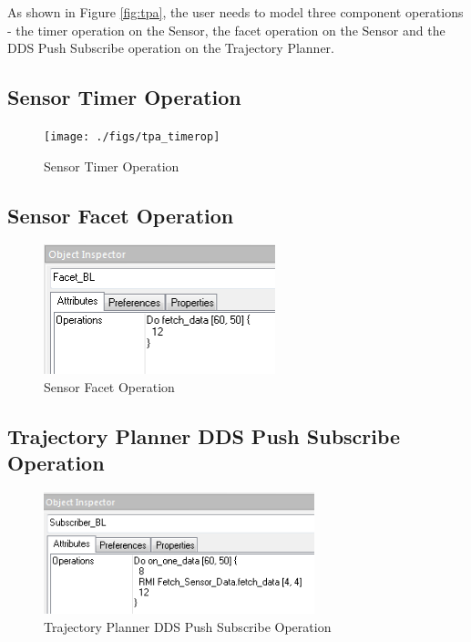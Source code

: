 As shown in Figure \ref{fig:tpa}, the user needs to model three component operations - the timer operation on the Sensor, the facet operation on the Sensor and the DDS Push Subscribe operation on the Trajectory Planner. 

\subsection{Sensor Timer Operation}

\begin{figure}[ht]
\centering
\texttt{[image: ./figs/tpa\_timerop]}
\caption{Sensor Timer Operation}
\label{fig:tpa_timer}
\vspace{-0.2in}
\end{figure}
\vspace{0.1in}

\subsection{Sensor Facet Operation}

\begin{figure}[ht]
\centering
\includegraphics[width=0.60\textwidth]{./figs/TPA_FACETOP}
\caption{Sensor Facet Operation}
\label{fig:tpa_facet}
\vspace{-0.2in}
\end{figure}
\vspace{0.1in}

\subsection{Trajectory Planner DDS Push Subscribe Operation}

\begin{figure}[ht]
\centering
\includegraphics[width=0.70\textwidth]{./figs/TPA_PSH}
\caption{Trajectory Planner DDS Push Subscribe Operation}
\label{fig:tpa_psh}
\vspace{-0.2in}
\end{figure}
\vspace{0.1in}



